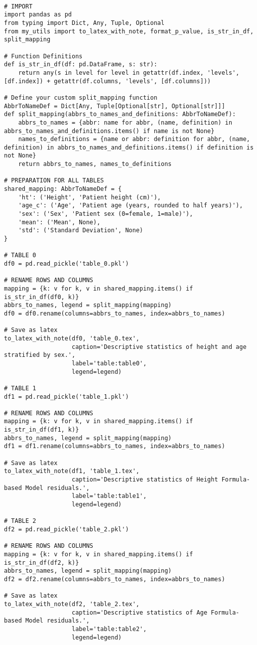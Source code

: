 \documentclass[11pt]{article}
\begin{document}
\begin{verbatim}

# IMPORT
import pandas as pd
from typing import Dict, Any, Tuple, Optional
from my_utils import to_latex_with_note, format_p_value, is_str_in_df, split_mapping

# Function Definitions
def is_str_in_df(df: pd.DataFrame, s: str):
    return any(s in level for level in getattr(df.index, 'levels', [df.index]) + getattr(df.columns, 'levels', [df.columns]))

# Define your custom split_mapping function
AbbrToNameDef = Dict[Any, Tuple[Optional[str], Optional[str]]]
def split_mapping(abbrs_to_names_and_definitions: AbbrToNameDef):
    abbrs_to_names = {abbr: name for abbr, (name, definition) in abbrs_to_names_and_definitions.items() if name is not None}
    names_to_definitions = {name or abbr: definition for abbr, (name, definition) in abbrs_to_names_and_definitions.items() if definition is not None}
    return abbrs_to_names, names_to_definitions

# PREPARATION FOR ALL TABLES
shared_mapping: AbbrToNameDef = {
    'ht': ('Height', 'Patient height (cm)'),
    'age_c': ('Age', 'Patient age (years, rounded to half years)'),
    'sex': ('Sex', 'Patient sex (0=female, 1=male)'),
    'mean': ('Mean', None),
    'std': ('Standard Deviation', None)
}

# TABLE 0
df0 = pd.read_pickle('table_0.pkl')

# RENAME ROWS AND COLUMNS
mapping = {k: v for k, v in shared_mapping.items() if is_str_in_df(df0, k)} 
abbrs_to_names, legend = split_mapping(mapping)
df0 = df0.rename(columns=abbrs_to_names, index=abbrs_to_names)

# Save as latex
to_latex_with_note(df0, 'table_0.tex',
                   caption='Descriptive statistics of height and age stratified by sex.', 
                   label='table:table0',
                   legend=legend)

# TABLE 1
df1 = pd.read_pickle('table_1.pkl')

# RENAME ROWS AND COLUMNS
mapping = {k: v for k, v in shared_mapping.items() if is_str_in_df(df1, k)} 
abbrs_to_names, legend = split_mapping(mapping)
df1 = df1.rename(columns=abbrs_to_names, index=abbrs_to_names)

# Save as latex
to_latex_with_note(df1, 'table_1.tex',
                   caption='Descriptive statistics of Height Formula-based Model residuals.',
                   label='table:table1',
                   legend=legend)

# TABLE 2
df2 = pd.read_pickle('table_2.pkl')

# RENAME ROWS AND COLUMNS
mapping = {k: v for k, v in shared_mapping.items() if is_str_in_df(df2, k)} 
abbrs_to_names, legend = split_mapping(mapping)
df2 = df2.rename(columns=abbrs_to_names, index=abbrs_to_names)

# Save as latex
to_latex_with_note(df2, 'table_2.tex',
                   caption='Descriptive statistics of Age Formula-based Model residuals.',
                   label='table:table2',
                   legend=legend)

\end{verbatim}
\end{document}
